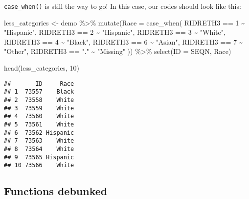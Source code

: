 \documentclass[
]{book}
\newenvironment{Shaded}{\begin{snugshade}}{\end{snugshade}}
\newcommand{\AttributeTok}[1]{\textcolor[rgb]{0.77,0.63,0.00}{#1}}
\newcommand{\DecValTok}[1]{\textcolor[rgb]{0.00,0.00,0.81}{#1}}
\newcommand{\FunctionTok}[1]{\textcolor[rgb]{0.00,0.00,0.00}{#1}}
\newcommand{\NormalTok}[1]{#1}
\newcommand{\OtherTok}[1]{\textcolor[rgb]{0.56,0.35,0.01}{#1}}
\newcommand{\SpecialCharTok}[1]{\textcolor[rgb]{0.00,0.00,0.00}{#1}}
\newcommand{\StringTok}[1]{\textcolor[rgb]{0.31,0.60,0.02}{#1}}
\begin{document}
\texttt{case\_when()} is still the way to go! In this case, our codes should look like this:

\begin{Shaded}
\begin{Highlighting}[]
\NormalTok{less\_categories }\OtherTok{\textless{}{-}}\NormalTok{ demo }\SpecialCharTok{\%\textgreater{}\%} 
    \FunctionTok{mutate}\NormalTok{(}\AttributeTok{Race =} \FunctionTok{case\_when}\NormalTok{(}
\NormalTok{          RIDRETH3 }\SpecialCharTok{==} \DecValTok{1} \SpecialCharTok{\textasciitilde{}} \StringTok{"Hispanic"}\NormalTok{,}
\NormalTok{          RIDRETH3 }\SpecialCharTok{==} \DecValTok{2} \SpecialCharTok{\textasciitilde{}} \StringTok{"Hispanic"}\NormalTok{,}
\NormalTok{          RIDRETH3 }\SpecialCharTok{==} \DecValTok{3} \SpecialCharTok{\textasciitilde{}} \StringTok{"White"}\NormalTok{,}
\NormalTok{          RIDRETH3 }\SpecialCharTok{==} \DecValTok{4} \SpecialCharTok{\textasciitilde{}} \StringTok{"Black"}\NormalTok{,}
\NormalTok{          RIDRETH3 }\SpecialCharTok{==} \DecValTok{6} \SpecialCharTok{\textasciitilde{}} \StringTok{"Asian"}\NormalTok{,}
\NormalTok{          RIDRETH3 }\SpecialCharTok{==} \DecValTok{7} \SpecialCharTok{\textasciitilde{}} \StringTok{"Other"}\NormalTok{,}
\NormalTok{          RIDRETH3 }\SpecialCharTok{==} \StringTok{"."} \SpecialCharTok{\textasciitilde{}} \StringTok{"Missing"}
\NormalTok{      )) }\SpecialCharTok{\%\textgreater{}\%}
    \FunctionTok{select}\NormalTok{(}\AttributeTok{ID =}\NormalTok{ SEQN, Race)}
\end{Highlighting}
\end{Shaded}

\begin{Shaded}
\begin{Highlighting}[]
\FunctionTok{head}\NormalTok{(less\_categories, }\DecValTok{10}\NormalTok{)}
\end{Highlighting}
\end{Shaded}

\begin{verbatim}
##       ID     Race
## 1  73557    Black
## 2  73558    White
## 3  73559    White
## 4  73560    White
## 5  73561    White
## 6  73562 Hispanic
## 7  73563    White
## 8  73564    White
## 9  73565 Hispanic
## 10 73566    White
\end{verbatim}

\hypertarget{functions-debunked-17}{%
\subsection{Functions debunked}\label{functions-debunked-17}}
\end{document}
